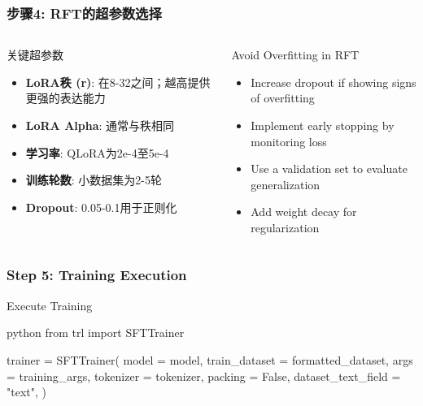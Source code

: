 \documentclass[aspectratio=169]{beamer}
\begin{document}
\begin{frame}[fragile]
	\frametitle{步骤4: RFT的超参数选择}
	\begin{columns}
		\begin{column}{0.48\textwidth}
			\begin{block}{关键超参数}
				\begin{itemize}
					\item \textbf{LoRA秩 (r)}: 在8-32之间；越高提供更强的表达能力
					\item \textbf{LoRA Alpha}: 通常与秩相同
					\item \textbf{学习率}: QLoRA为2e-4至5e-4
					\item \textbf{训练轮数}: 小数据集为2-5轮
					\item \textbf{Dropout}: 0.05-0.1用于正则化
				\end{itemize}
			\end{block}
		\end{column}
		\begin{column}{0.48\textwidth}
			\begin{block}{Avoid Overfitting in RFT}
				\begin{itemize}
					\item Increase dropout if showing signs of overfitting
					\item Implement early stopping by monitoring loss
					\item Use a validation set to evaluate generalization
					\item Add weight decay for regularization
				\end{itemize}
			\end{block}
		\end{column}
	\end{columns}
\end{frame}

\begin{frame}[fragile]
	\frametitle{Step 5: Training Execution}
	\begin{block}{Execute Training}
		\begin{mintedbox}{python}
from trl import SFTTrainer

trainer = SFTTrainer(
    model = model,
    train_dataset = formatted_dataset,
    args = training_args,
    tokenizer = tokenizer,
    packing = False,
    dataset_text_field = "text",
)
		\end{mintedbox}
	\end{block}
\end{frame}
\end{document}
